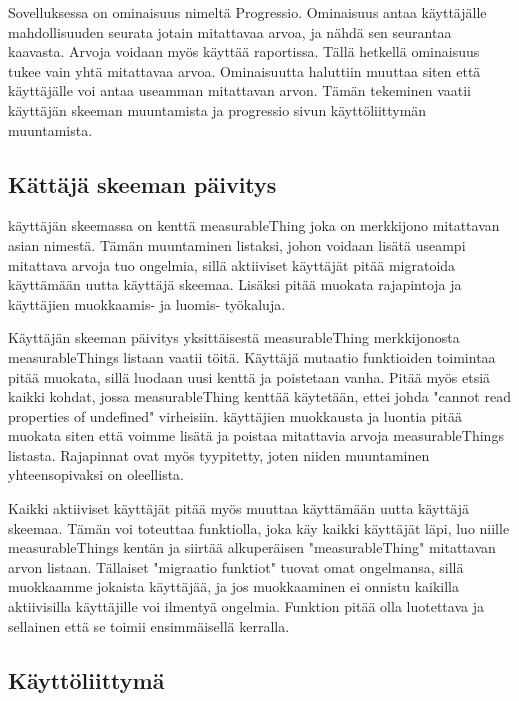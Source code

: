 


Sovelluksessa on ominaisuus nimeltä Progressio. Ominaisuus antaa käyttäjälle mahdollisuuden seurata jotain mitattavaa arvoa, ja nähdä sen seurantaa kaavasta.
Arvoja voidaan myös käyttää raportissa.
%
Tällä hetkellä ominaisuus tukee vain yhtä mitattavaa arvoa.
Ominaisuutta haluttiin muuttaa siten että käyttäjälle voi antaa useamman mitattavan arvon. 
Tämän tekeminen vaatii käyttäjän skeeman muuntamista ja progressio sivun käyttöliittymän muuntamista.
\medskip






\subsection*{Kättäjä skeeman päivitys}


käyttäjän skeemassa on kenttä measurableThing joka on merkkijono mitattavan asian nimestä.
Tämän muuntaminen listaksi, johon voidaan lisätä useampi mitattava arvoja tuo ongelmia, sillä aktiiviset käyttäjät pitää migratoida käyttämään uutta käyttäjä skeemaa. 
Lisäksi pitää muokata rajapintoja ja käyttäjien muokkaamis- ja luomis- työkaluja.
\medskip



Käyttäjän skeeman päivitys yksittäisestä measurableThing merkkijonosta measurableThings listaan vaatii töitä.
Käyttäjä mutaatio funktioiden toimintaa pitää muokata, sillä luodaan uusi kenttä ja poistetaan vanha.
Pitää myös etsiä kaikki kohdat, jossa measurableThing kenttää käytetään, ettei johda "cannot read properties of undefined"{} virheisiin.
käyttäjien muokkausta ja luontia pitää muokata siten että voimme lisätä ja poistaa mitattavia arvoja measurableThings listasta.
Rajapinnat ovat myös tyypitetty, joten niiden muuntaminen yhteensopivaksi on oleellista.
\medskip


Kaikki aktiiviset käyttäjät pitää myös muuttaa käyttämään uutta käyttäjä skeemaa.
Tämän voi toteuttaa funktiolla, joka käy kaikki käyttäjät läpi, luo niille measurableThings kentän ja siirtää alkuperäisen "measurableThing"{} mitattavan arvon listaan.
Tällaiset "migraatio funktiot"{} tuovat omat ongelmansa, sillä muokkaamme jokaista käyttäjää, ja jos muokkaaminen ei onnistu kaikilla aktiivisilla käyttäjille voi ilmentyä ongelmia.
Funktion pitää olla luotettava ja sellainen että se toimii ensimmäisellä kerralla.
\medskip




\subsection*{Käyttöliittymä}



